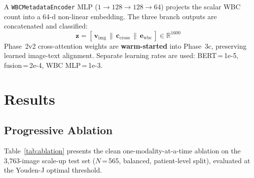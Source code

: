 \documentclass{article}
\begin{document}
A \texttt{WBCMetadataEncoder} MLP ($1\!\to\!128\!\to\!128\!\to\!64$) projects
the scalar WBC count into a 64-d non-linear embedding.
The three branch outputs are concatenated and classified:
\vspace{-2pt}
\begin{equation}
  \mathbf{z} = [\,\mathbf{v}_{\mathrm{img}} \,\|\,
  \mathbf{c}_{\mathrm{cross}} \,\|\, \mathbf{e}_{\mathrm{wbc}}\,]
  \in \mathbb{R}^{1600}
  \label{eq:p3c}
\end{equation}
Phase~2v2 cross-attention weights are \textbf{warm-started} into Phase~3c,
preserving learned image-text alignment.
Separate learning rates are used: BERT\,=\,1e-5, fusion\,=\,2e-4, WBC MLP\,=\,1e-3.

\section{Results}

\subsection{Progressive Ablation}

Table~\ref{tab:ablation} presents the clean one-modality-at-a-time ablation
on the 3,763-image scale-up test set ($N$\,=\,565, balanced, patient-level split),
evaluated at the Youden-J optimal threshold.

\begin{table}[h]
\centering\small
\caption{One-modality-at-a-time ablation on scaleup test set ($N$\,=\,565).}
\label{tab:ablation}
\end{table}
\end{document}
